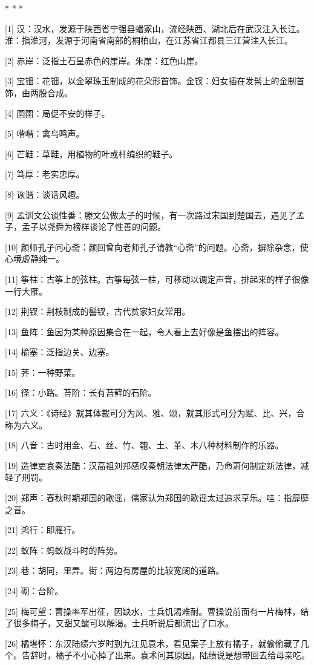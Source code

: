 \documentclass[12pt,UTF8]{ctexbook}
\begin{document}
* * *



[1] 汉：汉水，发源于陕西省宁强县蟠冢山，流经陕西、湖北后在武汉注入长江。淮：指淮河，发源于河南省南部的桐柏山，在江苏省江都县三江营注入长江。

[2] 赤岸：泛指土石呈赤色的崖岸。朱崖：红色山崖。

[3] 宝钿：花钿，以金翠珠玉制成的花朵形首饰。金钗：妇女插在发髻上的金制首饰，由两股合成。

[4] 圉圉：局促不安的样子。

[5] 喈喈：禽鸟鸣声。

[6] 芒鞋：草鞋，用植物的叶或杆编织的鞋子。

[7] 笃厚：老实忠厚。

[8] 诙谐：谈话风趣。

[9] 孟训文公谈性善：滕文公做太子的时候，有一次路过宋国到楚国去，遇见了孟子，孟子以尧舜为榜样谈论了性善的问题。

[10] 颜师孔子问心斋：颜回曾向老师孔子请教“心斋”的问题。心斋，摒除杂念，使心境虚静纯一。

[11] 筝柱：古筝上的弦柱。古筝每弦一柱，可移动以调定声音，排起来的样子很像一行大雁。

[12] 荆钗：荆枝制成的髻钗，古代贫家妇女常用。

[13] 鱼阵：鱼因为某种原因集合在一起，令人看上去好像是鱼摆出的阵容。

[14] 榆塞：泛指边关、边塞。

[15] 荠：一种野菜。

[16] 径：小路。苔阶：长有苔藓的石阶。

[17] 六义：《诗经》就其体裁可分为风、雅、颂，就其形式可分为赋、比、兴，合称为六义。

[18] 八音：古时用金、石、丝、竹、匏、土、革、木八种材料制作的乐器。

[19] 造律吏哀秦法酷：汉高祖刘邦感叹秦朝法律太严酷，乃命萧何制定新法律，减轻了刑罚。

[20] 郑声：春秋时期郑国的歌谣，儒家认为郑国的歌谣太过追求享乐。哇：指靡靡之音。

[21] 鸿行：即雁行。

[22] 蚁阵：蚂蚁战斗时的阵势。

[23] 巷：胡同，里弄。街：两边有房屋的比较宽阔的道路。

[24] 砌：台阶。

[25] 梅可望：曹操率军出征，因缺水，士兵饥渴难耐。曹操说前面有一片梅林，结了很多梅子，又甜又酸可以解渴。士兵听说后都流出了口水。

[26] 橘堪怀：东汉陆绩六岁时到九江见袁术，看见案子上放有橘子，就偷偷藏了几个。告辞时，橘子不小心掉了出来。袁术问其原因，陆绩说是想带回去给母亲吃。
\end{document}
